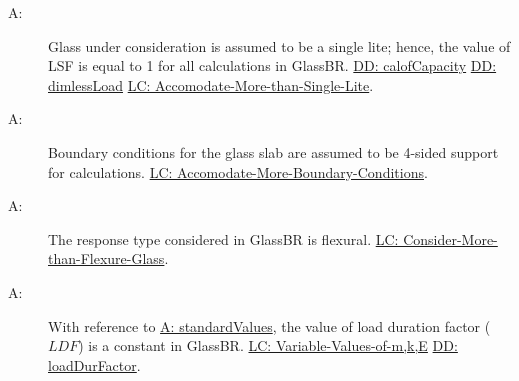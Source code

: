 \documentclass[12pt]{article}
\newcounter{assumpnum}
\newcommand{\atheassumpnum}{A\theassumpnum}
\begin{document}
\begin{description}
\item[\atheassumpnum\label{A:glassLite}:]Glass under consideration is assumed to be a single lite; hence, the value of LSF is equal to 1 for all calculations in GlassBR. \hyperref[DD:calofCapacity]{DD: calofCapacity} \hyperref[DD:dimlessLoad]{DD: dimlessLoad} \hyperref[accMoreThanSingleLite]{LC: Accomodate-More-than-Single-Lite}.
\end{description}
\begin{description}
\item[\atheassumpnum\label{A:boundaryConditions}:]Boundary conditions for the glass slab are assumed to be 4-sided support for calculations. \hyperref[accMoreBoundaryConditions]{LC: Accomodate-More-Boundary-Conditions}.
\end{description}
\begin{description}
\item[\atheassumpnum\label{A:responseType}:]The response type considered in GlassBR is flexural. \hyperref[considerMoreThanFlexGlass]{LC: Consider-More-than-Flexure-Glass}.
\end{description}
\begin{description}
\item[\atheassumpnum\label{A:ldfConstant}:]With reference to \hyperref[A:standardValues]{A: standardValues}, the value of load duration factor ($LDF$) is a constant in GlassBR. \hyperref[varValsOfmkE]{LC: Variable-Values-of-m,k,E} \hyperref[DD:loadDurFactor]{DD: loadDurFactor}.
\end{description}
\end{document}
